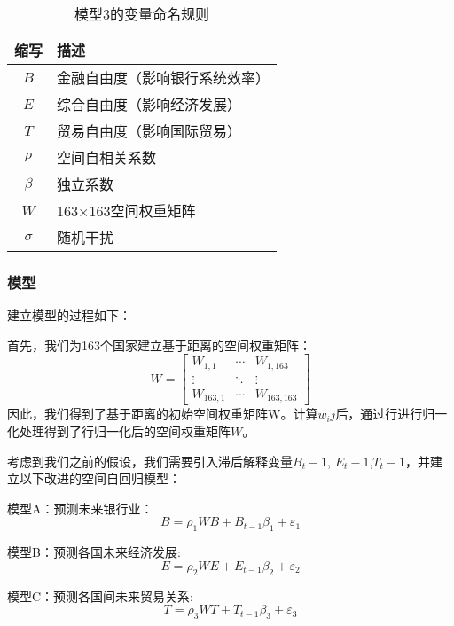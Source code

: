 \documentclass[withoutpreface,bwprint]{cumcmthesis} %
\begin{document}
\begin{table}[h]
	\centering
	\caption{模型3的变量命名规则}
	\label{tab7}
	\begin{tabular}{cl}
		\toprule[1.5pt]
		缩写 & 描述 \\
		\midrule[1pt]
		\(B\) & 金融自由度（影响银行系统效率） \\
		\(E\) & 综合自由度（影响经济发展） \\
		\(T\) & 贸易自由度（影响国际贸易） \\
		\(\rho\) & 空间自相关系数 \\
		\(\beta\) & 独立系数 \\
		\(W\) & 163×163空间权重矩阵 \\
		\(\sigma\) & 随机干扰 \\
		\bottomrule[1.5pt]
	\end{tabular}
\end{table}

\subsubsection{模型}
建立模型的过程如下：

首先，我们为163个国家建立基于距离的空间权重矩阵：
\begin{equation}
	W=\left[\begin{array}{ccc}
		W_{1,1} & \cdots & W_{1,163} \\
		\vdots & \ddots & \vdots \\
		W_{163,1} & \cdots & W_{163,163}
	\end{array}\right]
\end{equation}
因此，我们得到了基于距离的初始空间权重矩阵W。计算$w_ij$后，通过行进行归一化处理得到了行归一化后的空间权重矩阵$W$。

考虑到我们之前的假设，我们需要引入滞后解释变量$B_t-1$, $E_t-1$,$T_t-1$，并建立以下改进的空间自回归模型：

模型A：预测未来银行业：
\begin{equation}
	B=\rho_1 W B+B_{t-1} \beta_1+\varepsilon_1
\end{equation}

模型B：预测各国未来经济发展:
\begin{equation}
	E=\rho_2 W E+E_{t-1} \beta_2+\varepsilon_2
\end{equation}

模型C：预测各国间未来贸易关系:
\begin{equation}
	T=\rho_3 W T+T_{t-1} \beta_3+\varepsilon_3
\end{equation}
\end{document}
